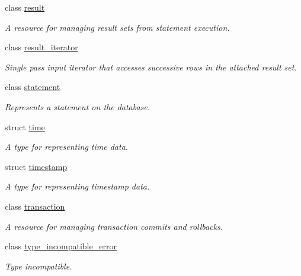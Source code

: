 \begin{DoxyCompactItemize}
class \mbox{\hyperlink{classnanodbc_1_1result}{result}}
\begin{DoxyCompactList}\small\item\em A resource for managing result sets from statement execution. \end{DoxyCompactList}\item 
class \mbox{\hyperlink{classnanodbc_1_1result__iterator}{result\+\_\+iterator}}
\begin{DoxyCompactList}\small\item\em Single pass input iterator that accesses successive rows in the attached result set. \end{DoxyCompactList}\item 
class \mbox{\hyperlink{classnanodbc_1_1statement}{statement}}
\begin{DoxyCompactList}\small\item\em Represents a statement on the database. \end{DoxyCompactList}\item 
struct \mbox{\hyperlink{structnanodbc_1_1time}{time}}
\begin{DoxyCompactList}\small\item\em A type for representing time data. \end{DoxyCompactList}\item 
struct \mbox{\hyperlink{structnanodbc_1_1timestamp}{timestamp}}
\begin{DoxyCompactList}\small\item\em A type for representing timestamp data. \end{DoxyCompactList}\item 
class \mbox{\hyperlink{classnanodbc_1_1transaction}{transaction}}
\begin{DoxyCompactList}\small\item\em A resource for managing transaction commits and rollbacks. \end{DoxyCompactList}\item 
class \mbox{\hyperlink{classnanodbc_1_1type__incompatible__error}{type\+\_\+incompatible\+\_\+error}}
\begin{DoxyCompactList}\small\item\em Type incompatible. \end{DoxyCompactList}\end{DoxyCompactItemize}
